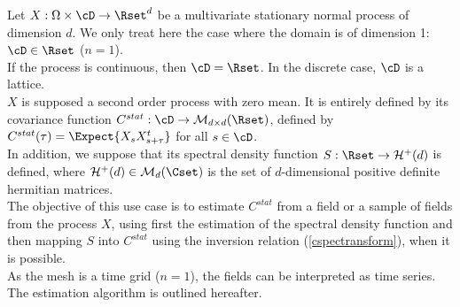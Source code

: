 \renewcommand{\filename}{docUC_StocProc_StationaryCovarianceFunction_Estimation.tex}\renewcommand{\filetitle}{UC : Estimation of a stationary covariance function}

\HeaderIIILevel


Let $X: \Omega \times \cD \rightarrow \Rset^d$  be a multivariate  stationary normal process of dimension $d$. We only treat here the case where the domain is of dimension 1: $\cD \in \Rset$ ($n=1$). \\
If the process is continuous, then $\cD=\Rset$. In the discrete case, $\cD$  is a lattice. \\

$X$ is supposed a second order process with zero mean. It is entirely defined  by  its covariance function $C^{stat}:  \cD \rightarrow  \mathcal{M}_{d \times d}(\Rset)$, defined by $C^{stat}(\tau)=\Expect{X_sX_{s+\tau}^t}$ for all $s\in \cD$.\\

In addition, we suppose that its spectral density function $S : \Rset \rightarrow \mathcal{H}^+(d)$ is defined,  where $\mathcal{H}^+(d) \in \mathcal{M}_d(\Cset)$ is the set of $d$-dimensional positive definite hermitian matrices.\\

The objective of this use case is to estimate $C^{stat}$ from a field or a sample of fields from the process $X$, using first the estimation of the spectral density function and then mapping $S$ into $C^{stat}$ using the inversion relation (\ref{cspectransform}), when it is possible.\\
As the mesh is a time grid ($n=1$), the fields can be interpreted as time series.\\

The estimation  algorithm is outlined hereafter.\\

